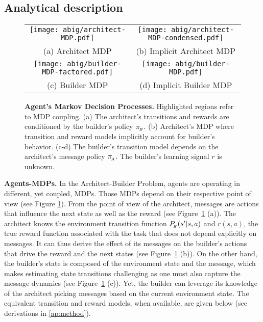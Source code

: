 \subsection{Analytical description}
\begin{figure}[!h]
    \centering
    \begin{tabular}{cc}
         \texttt{[image: abig/architect-MDP.pdf]} & \texttt{[image: abig/architect-MDP-condensed.pdf]}  \\
        \small (a) Architect MDP & \small (b) Implicit Architect MDP\\
        \texttt{[image: abig/builder-MDP-factored.pdf]} & \texttt{[image: abig/builder-MDP.pdf]} \\
        \small (c) Builder MDP & \small (d) Implicit Builder MDP
    \end{tabular}
    \caption{\textbf{Agent's Markov Decision Processes.} Highlighted regions refer to MDP coupling. (a) The architect's transitions and rewards are conditioned by the builder's policy $\pi_{\!_B}$. (b) Architect's MDP where transition and reward models implicitly account for builder's behavior. (c-d) The builder's transition model depends on the architect's message policy $\pi_{\!_A}$. The builder's learning signal $r$ is unknown.}
    \label{fig:mdp-graphs}
\end{figure}
\textbf{Agents-MDPs. } In the Architect-Builder Problem, agents are operating in different, yet coupled, MDPs. Those MDPs depend on their respective point of view (see Figure \ref{fig:mdp-graphs}).
\label{ap:pb-definition}
From the point of view of the architect, messages are actions that influence the next state as well as the reward (see Figure~\ref{fig:mdp-graphs} (a)). The architect knows the environment transition function $P_{\!_E}(s'|s,a)$ and $r(s,a)$, the true reward function associated with the task that does not depend explicitly on messages. It can thus derive the effect of its messages on the builder's actions that drive the reward and the next states (see Figure~\ref{fig:mdp-graphs} (b)). On the other hand, the builder's state is composed of the environment state and the message, which makes estimating state transitions challenging as one must also capture the message dynamics (see Figure~\ref{fig:mdp-graphs} (c)). Yet, the builder can leverage  its knowledge of the architect picking messages based on the current environment state. The equivalent transition and reward models, when available, are given below (see derivations in \ap\ref{ap:method}). 
